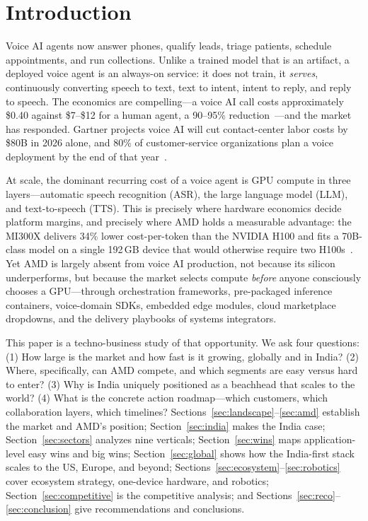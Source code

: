 \documentclass[blind]{gtac}
\begin{document}

\section{Introduction}
\label{sec:intro}

Voice AI agents now answer phones, qualify leads, triage patients, schedule appointments, and run collections. Unlike a trained model that is an artifact, a deployed voice agent is an always-on service: it does not train, it \emph{serves}, continuously converting speech to text, text to intent, intent to reply, and reply to speech. The economics are compelling---a voice AI call costs approximately \$0.40 against \$7--\$12 for a human agent, a 90--95\% reduction~\cite{assemblyai_2026,grandview}---and the market has responded. Gartner projects voice AI will cut contact-center labor costs by \$80B in 2026 alone, and 80\% of customer-service organizations plan a voice deployment by the end of that year~\cite{assemblyai_2026}.

At scale, the dominant recurring cost of a voice agent is GPU compute in three layers---automatic speech recognition (ASR), the large language model (LLM), and text-to-speech (TTS). This is precisely where hardware economics decide platform margins, and precisely where AMD holds a measurable advantage: the MI300X delivers 34\% lower cost-per-token than the NVIDIA H100 and fits a 70B-class model on a single 192\,GB device that would otherwise require two H100s~\cite{spheron_rocm,vllm_rocm}. Yet AMD is largely absent from voice AI production, not because its silicon underperforms, but because the market selects compute \emph{before} anyone consciously chooses a GPU---through orchestration frameworks, pre-packaged inference containers, voice-domain SDKs, embedded edge modules, cloud marketplace dropdowns, and the delivery playbooks of systems integrators.

This paper is a techno-business study of that opportunity. We ask four questions: (1) How large is the market and how fast is it growing, globally and in India? (2) Where, specifically, can AMD compete, and which segments are easy versus hard to enter? (3) Why is India uniquely positioned as a beachhead that scales to the world? (4) What is the concrete action roadmap---which customers, which collaboration layers, which timelines? Sections~\ref{sec:landscape}--\ref{sec:amd} establish the market and AMD's position; Section~\ref{sec:india} makes the India case; Section~\ref{sec:sectors} analyzes nine verticals; Section~\ref{sec:wins} maps application-level easy wins and big wins; Section~\ref{sec:global} shows how the India-first stack scales to the US, Europe, and beyond; Sections~\ref{sec:ecosystem}--\ref{sec:robotics} cover ecosystem strategy, one-device hardware, and robotics; Section~\ref{sec:competitive} is the competitive analysis; and Sections~\ref{sec:reco}--\ref{sec:conclusion} give recommendations and conclusions.
\end{document}
